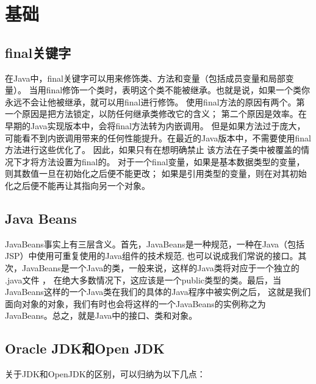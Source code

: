 \documentclass{book}
\begin{document}
\section{基础}

\subsection{final关键字}

在Java中，final关键字可以用来修饰类、方法和变量（包括成员变量和局部变量）。
当用final修饰一个类时，表明这个类不能被继承。也就是说，如果一个类你永远不会让他被继承，就可以用final进行修饰。
使用final方法的原因有两个。第一个原因是把方法锁定，以防任何继承类修改它的含义；
第二个原因是效率。在早期的Java实现版本中，会将final方法转为内嵌调用。
但是如果方法过于庞大，可能看不到内嵌调用带来的任何性能提升。在最近的Java版本中，不需要使用final方法进行这些优化了。
因此，如果只有在想明确禁止 该方法在子类中被覆盖的情况下才将方法设置为final的。
对于一个final变量，如果是基本数据类型的变量，则其数值一旦在初始化之后便不能更改；
如果是引用类型的变量，则在对其初始化之后便不能再让其指向另一个对象。

\subsection{Java Beans}

JavaBeans事实上有三层含义。首先，JavaBeans是一种规范，一种在Java（包括JSP）中使用可重复使用的Java组件的技术规范,
也可以说成我们常说的接口。其次，JavaBeans是一个Java的类，一般来说，这样的Java类将对应于一个独立的 .java文件 ，
在绝大多数情况下，这应该是一个public类型的类。最后，当JavaBeans这样的一个Java类在我们的具体的Java程序中被实例之后，
这就是我们面向对象的对象，我们有时也会将这样的一个JavaBeans的实例称之为JavaBeans。总之，就是Java中的接口、类和对象。

\subsection{Oracle JDK和Open JDK}

关于JDK和OpenJDK的区别，可以归纳为以下几点：
\end{document}
